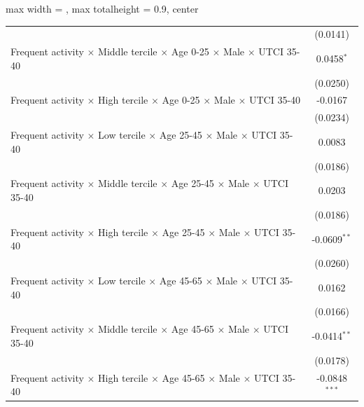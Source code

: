 \begin{table}[htbp]
\begin{adjustbox}{max width = \textwidth, max totalheight = 0.9\textheight, center}
\begin{tabular}{lc}
                                                                                                               & (0.0141)\\   
         Frequent activity $\times$ Middle tercile $\times$ Age 0-25 $\times$ Male $\times$ UTCI 35-40         & 0.0458$^{*}$\\   
                                                                                                               & (0.0250)\\   
         Frequent activity $\times$ High tercile $\times$ Age 0-25 $\times$ Male $\times$ UTCI 35-40           & -0.0167\\   
                                                                                                               & (0.0234)\\   
         Frequent activity $\times$ Low tercile $\times$ Age 25-45 $\times$ Male $\times$ UTCI 35-40           & 0.0083\\   
                                                                                                               & (0.0186)\\   
         Frequent activity $\times$ Middle tercile $\times$ Age 25-45 $\times$ Male $\times$ UTCI 35-40        & 0.0203\\   
                                                                                                               & (0.0186)\\   
         Frequent activity $\times$ High tercile $\times$ Age 25-45 $\times$ Male $\times$ UTCI 35-40          & -0.0609$^{**}$\\   
                                                                                                               & (0.0260)\\   
         Frequent activity $\times$ Low tercile $\times$ Age 45-65 $\times$ Male $\times$ UTCI 35-40           & 0.0162\\   
                                                                                                               & (0.0166)\\   
         Frequent activity $\times$ Middle tercile $\times$ Age 45-65 $\times$ Male $\times$ UTCI 35-40        & -0.0414$^{**}$\\   
                                                                                                               & (0.0178)\\   
         Frequent activity $\times$ High tercile $\times$ Age 45-65 $\times$ Male $\times$ UTCI 35-40          & -0.0848$^{***}$\\   

\end{tabular}
\end{adjustbox}
\end{table}

